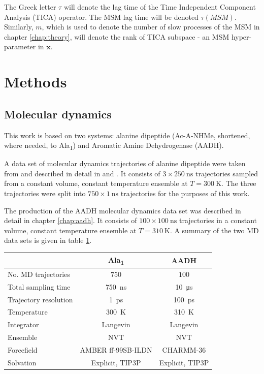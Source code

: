 The Greek letter $\tau$ will denote the lag time of the Time Independent Component Analysis (TICA) operator. The MSM lag time will be denoted $\tau(MSM)$. Similarly, $m$, which is used to denote the number of slow processes of the MSM in chapter \ref{chap:theory}, will denote the rank of TICA subspace - an MSM hyper-parameter in $\mathbf{x}$.



\section{Methods}\label{sec:methods}
\subsection{Molecular dynamics}
This work is based on two systems: alanine dipeptide (Ac-A-NHMe, shortened, where needed, to Ala\textsubscript{1}) and Aromatic Amine Dehydrogenase (AADH). 

 A data set of molecular dynamics trajectories of alanine dipeptide were taken from \cite{wehmeyerTimelaggedAutoencodersDeep2018a} and described in detail in \cite{nuskeMarkovStateModels2017b} and \cite{harveyACEMDAcceleratingBiomolecular2009}.  It consists of $3\times \SI{250}{\nano\second}$ trajectories sampled from a constant volume, constant temperature ensemble at $T=\SI{300}{\kelvin}$. The three trajectories were split into $750\times\SI{1}{\nano\second}$ trajectories for the purposes of this work. 
 
The production of the AADH molecular dynamics data set was described in detail in chapter \ref{chap:aadh}.  It consists of $100\times \SI{100}{\nano\second}$ trajectories in a constant volume, constant temperature ensemble at $T=\SI{310}{\kelvin}$. A summary of the two MD data sets is given in table \ref{tab:md_specs}. 

\begin{table}
    \centering
    \begin{tabular}{|l|c|c|}
        \hline
         & Ala\textsubscript{1} & AADH \\
         \hline\hline
         No. MD trajectories & $750$ & $100$ \\
         Total sampling time & \SI{750}{\nano\second} & \SI{10}{\micro\second} \\
         Trajectory resolution & \SI{1}{\pico\second} & \SI{100}{\pico\second} \\
         Temperature & \SI{300}{\kelvin} & \SI{310}{\kelvin} \\
         Integrator & Langevin & Langevin \\
         Ensemble & NVT & NVT \\
         Forcefield & AMBER ff-99SB-ILDN & CHARMM-36 \\
         Solvation & Explicit, TIP3P & Explicit, TIP3P \\
         \hline
    \end{tabular}
    \label{tab:md_specs}
\end{table}

